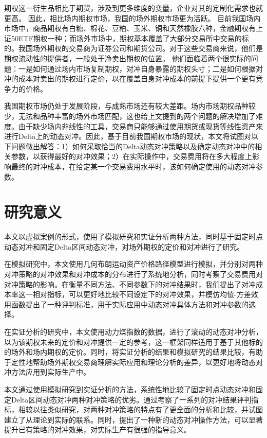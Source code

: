 期权这一衍生品相比于期货，涉及到更多维度的变量，企业对其的定制化需求也就更高。
因此，相比场内期权市场，我国的场外期权市场更为活跃。
目前我国场内市场中，商品期权有白糖、棉花、豆粕、玉米、铜和天然橡胶六种，金融期权有上证50ETF期权一种；而场外市场中，期权基本覆盖了大部分交易所中交易的标的。我国场外期权的交易商为证券公司和期货公司。对于这些交易商来说，他们是期权流动性的提供者，一般处于净卖出期权的位置。
他们面临着两个很实际的问题：一是如何通过场内市场复制期权，对冲自身暴露的期权头寸；二是如何根据对冲的成本对卖出的期权进行定价，以在覆盖自身对冲成本的前提下提供一个更有竞争力的价格。

我国期权市场仍处于发展阶段，与成熟市场还有较大差距。场内市场期权品种较少，无法和品种丰富的场外市场匹配，这也给上文提到的两个问题的解决增加了难度。由于缺少场内非线性的工具，交易商只能够通过使用期货或现货等线性资产来进行Delta上的动态对冲。因此，基于目前我国期权市场的现状，本文将试图对以下问题做出解答：1）如何采取恰当的Delta动态对冲策略以及确定动态对冲中的相关参数，以获得最好的对冲效果；2）在实际操作中，交易费用将在多大程度上影响最终的对冲成本，在给定某一个交易费用水平时，该如何确定使用的动态对冲参数。

\section{研究意义}

本文以虚拟案例的形式，使用了模拟研究和实证分析两种方法，同时基于固定时点动态对冲和固定Delta区间动态对冲，对场外期权的定价和对冲进行了研究。

在模拟研究中，本文使用几何布朗运动资产价格路径模型进行模拟，并分别对两种对冲策略的对冲效果和对冲成本的分布进行了系统地分析，同时考察了交易费用对对冲策略的影响。在衡量不同方法、不同参数下的对冲结果时，我们提出了对冲成本率这一相对指标，可以更好地比较不同设定下的对冲效果，并模仿均值-方差效用函数提出了一种评判标准，用于实际应用中动态对冲具体方法和对冲参数的选择。

在实证分析的研究中，本文使用动力煤指数的数据，进行了滚动的动态对冲分析，以为该期权未来的定价和对冲提供一定的参考，这一框架同样适用于基于其他标的的场外和场内期权的定价。同时，将实证分析的结果和模拟研究的结果比较，有助于定性地帮助场外期权交易商理解实际应用和理论分析的差异，以更好地将动态对冲方法应用到实际生产中。

本文通过使用模拟研究到实证分析的方法，系统性地比较了固定时点动态对冲和固定Delta区间动态对冲两种对冲策略的优劣。通过考察了一系列的对冲结果评判指标，相较以往类似研究，对两种对冲策略的特点有了更全面的分析和比较，并试图建立了从理论到实际的联系。同时，提出了一种新的动态对冲操作方法，可以显著提升已有策略的对冲效果，对实际生产有很强的指导意义。

